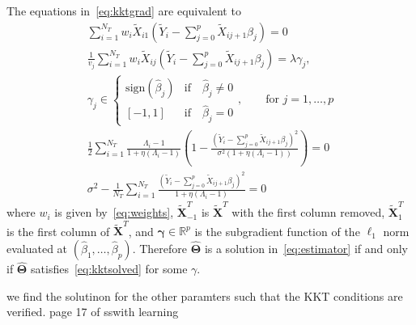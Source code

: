\documentclass[12pt,letter]{article}\usepackage[]{graphicx}\usepackage[]{color}
\newcommand{\tm}[1]{\textrm{{#1}}}
\newcommand{\bX}{\textbf{X}}
\newcommand{\bXtilde}{\widetilde{\bX}}
\newcommand{\Xtilde}{\widetilde{X}}
\newcommand{\Ytilde}{\widetilde{Y}}
\newcommand{\bTheta}{\boldsymbol{\Theta}}
\begin{document}
The equations in~\eqref{eq:kktgrad} are equivalent to
\begin{equation}
	\begin{aligned}
		\sum_{i=1}^{N_T}w_i \Xtilde_{i1}\left(  \Ytilde_i - \sum_{j=0}^{p}\Xtilde_{ij+1}\beta_j \right)  = 0\\
		\frac{1}{v_j} \sum_{i=1}^{N_T}w_i \Xtilde_{ij}\left(  \Ytilde_i - \sum_{j=0}^{p}\Xtilde_{ij+1}\beta_j \right) =  \lambda \gamma_j, \\
		\gamma_j \in \begin{cases}
			\tm{sign}(\hat{\beta}_j) & \tm{if} \quad \hat{\beta}_j \neq 0 \\
			[-1,1] & \tm{if}\quad \hat{\beta}_j = 0
		\end{cases}, \qquad \tm{for }j=1, \ldots, p   \\
		\frac{1}{2} \sum_{i=1}^{N_T} \frac{\Lambda_i - 1}{1 + \eta(\Lambda_i - 1)} \left(1- \frac{\left(  \Ytilde_i - \sum_{j=0}^{p}\Xtilde_{ij+1}\beta_j \right) ^2}{\sigma^2 (1+\eta(\Lambda_i-1))}  \right) = 0  \\
		{\sigma^2} - \frac{1}{N_T}\sum_{i=1}^{N_T}\frac{\left(  \Ytilde_i - \sum_{j=0}^{p}\Xtilde_{ij+1}\beta_j \right) ^2}{1 + \eta (\Lambda_i-1)} = 0
	\end{aligned}\label{eq:kktsolved}
\end{equation}
where $w_i$ is given by~\eqref{eq:weights}, $\bXtilde^T_{-1}$ is $\bXtilde^T$ with the first column removed, $\bXtilde^T_1$ is the first column of $\bXtilde^T$, and $\boldsymbol{\gamma} \in \mathbb{R}^p$ is the subgradient function of the $\ell_1$ norm evaluated at $(\hat{\beta}_1, \ldots, \hat{\beta}_p)$. Therefore $\widehat{\bTheta}$ is a solution in~\eqref{eq:estimator} if and only if $\widehat{\bTheta}$ satisfies~\eqref{eq:kktsolved} for some $\gamma$.

we find the solutinon for the other paramters such that the KKT conditions are verified.
page 17 of sswith learning
\end{document}
